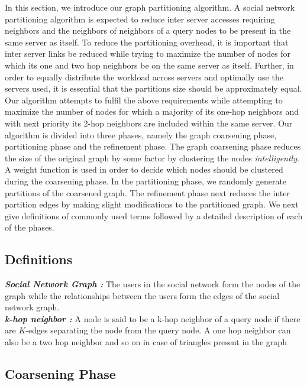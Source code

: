 \documentclass[letterpaper]{article}
\begin{document}
In this section, we introduce our graph partitioning algorithm. A social network  partitioning algorithm is expected to reduce inter server accesses requiring neighbors and the neighbors of neighbors of a query nodes to be present in the same server as itself. 
 To reduce the partitioning overhead, it is important that inter server links be reduced while trying to maximize the number of nodes for which its one and two hop neighbors be on the same server as itself.
 Further, in order to equally distribute the workload across servers and optimally use the servers used, it is
 essential that the partitions size should be approximately equal. Our algorithm attempts to fulfil 
 the above requirements while attempting to maximize the number of nodes for which a majority of its 
one-hop neighbors and with next priority its 2-hop neighbors are included within the same server.
 Our algorithm is divided into three phases, namely the graph coarsening phase, partitioning 
phase and the refinement phase. The graph coarsening phase reduces the size of the original graph by some
factor by clustering the nodes \emph{intelligently}.  A weight function is used 
in order to decide which nodes should be clustered  during the coarsening phase. In the partitioning phase, we 
randomly generate partitions of the coarsened graph. The refinement phase next 
reduces the inter partition edges by making slight modifications to the partitioned graph. We next give 
definitions of commonly used terms followed by a detailed description of each of the phases.



\subsection{Definitions}
\textbf {\it{Social Network Graph :} }The users in the social network
form the nodes of the graph while the relationships between
the users form the edges of the social network graph.\\
\textbf{\it{k-hop neighbor :}} A node is said to be a k-hop neighbor of a
query node if there are  $K$-edges separating the node
from the query node. A one hop neighbor can also be a two hop neighbor and so on in case of triangles present in the graph

\subsection{Coarsening Phase}
\end{document}
